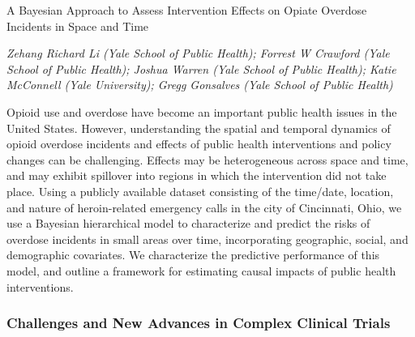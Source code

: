 \begin{itemize}
A Bayesian Approach to Assess Intervention Effects on Opiate Overdose Incidents in Space and Time

\emph{\footnotesize Zehang Richard Li (Yale School of Public Health); Forrest W Crawford (Yale School of Public Health); Joshua Warren (Yale School of Public Health); Katie McConnell  (Yale University); Gregg Gonsalves  (Yale School of Public Health)}

Opioid use and overdose have become an important public health issues in the United States. However, understanding the spatial and temporal dynamics of opioid overdose incidents and effects of public health interventions and policy changes can be challenging. Effects may be heterogeneous across space and time, and may exhibit spillover into regions in which the intervention did not take place. Using a publicly available dataset consisting of the time/date, location, and nature of heroin-related emergency calls in the city of Cincinnati, Ohio, we use a Bayesian hierarchical model to characterize and predict the risks of overdose incidents in small areas over time, incorporating geographic, social, and demographic covariates. We characterize the predictive performance of this model, and outline a framework for estimating causal impacts of public health interventions.

\end{itemize}

\subsubsection*{Challenges and New Advances in Complex Clinical Trials}

